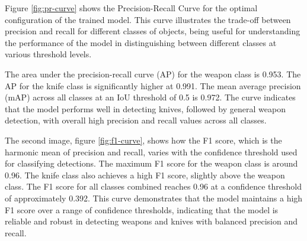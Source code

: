 Figure \ref{fig:pr-curve} shows the Precision-Recall Curve for the optimal configuration of the trained model. This curve 
illustrates the trade-off between precision and recall for different classes of objects, being useful for 
understanding the performance of the model in distinguishing between different classes at various threshold levels.

The area under the precision-recall curve (AP) for the weapon class is 0.953. The AP for the knife class is 
significantly higher at 0.991. The mean average precision (mAP) across all classes at an IoU threshold of 
0.5 is 0.972. The curve indicates that the model performs well in detecting knives, followed by 
general weapon detection, with overall high precision and recall values across all classes.

The second image, figure \ref{fig:f1-curve}, shows how the F1 score, which is the harmonic mean of 
precision and recall, varies with the confidence threshold used for classifying detections.
The maximum F1 score for the weapon class is around 0.96. The knife class also achieves a high F1 score, slightly 
above the weapon class. The F1 score for all classes combined reaches 0.96 at a confidence threshold of approximately 
0.392. This curve demonstrates that the model maintains a high F1 score over a range of confidence thresholds, 
indicating that the model is reliable and robust in detecting weapons and knives with balanced precision and recall.

